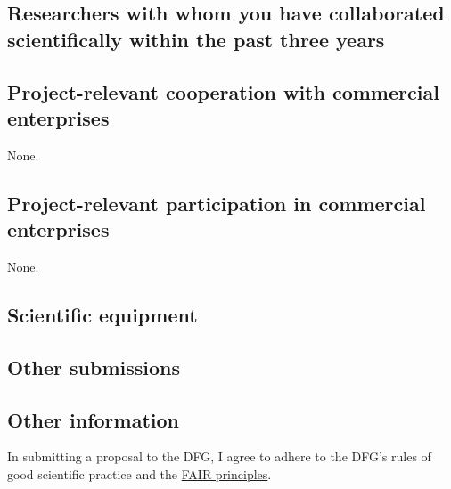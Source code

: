 \documentclass{scrartcl}
\begin{document}
\subsection{Researchers with whom you have collaborated scientifically within the past three years}


\subsection{Project-relevant cooperation with commercial enterprises}
None.

\subsection{Project-relevant participation in commercial enterprises}
None.

\subsection{Scientific equipment}

\subsection{Other submissions}

\subsection{Other information}
In submitting a proposal to the DFG, I agree to adhere to the DFG's rules of good scientific practice and the \href{https://www.nature.com/articles/sdata201618}{FAIR principles}.

\end{document}
